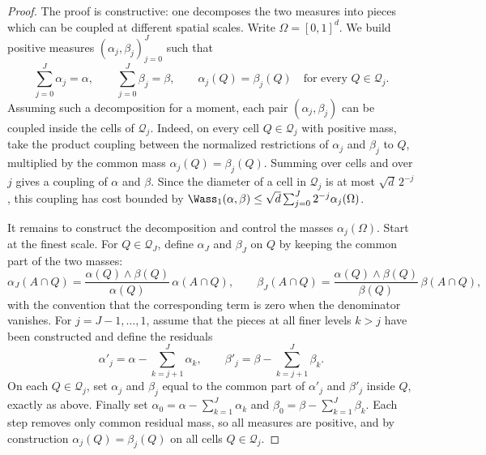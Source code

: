 \begin{proof}
	The proof is constructive: one decomposes the two measures into pieces which can be coupled at different spatial scales. Write \(\Omega=[0,1]^d\). We build positive measures \((\alpha_j,\beta_j)_{j=0}^J\) such that
	\[
		\sum_{j=0}^J\alpha_j=\alpha,
		\qquad
		\sum_{j=0}^J\beta_j=\beta,
		\qquad
		\alpha_j(Q)=\beta_j(Q)
		\quad\text{for every }Q\in\mathcal Q_j.
	\]
	Assuming such a decomposition for a moment, each pair \((\alpha_j,\beta_j)\) can be coupled inside the cells of \(\mathcal Q_j\). Indeed, on every cell \(Q\in\mathcal Q_j\) with positive mass, take the product coupling between the normalized restrictions of \(\alpha_j\) and \(\beta_j\) to \(Q\), multiplied by the common mass \(\alpha_j(Q)=\beta_j(Q)\). Summing over cells and over \(j\) gives a coupling of \(\alpha\) and \(\beta\). Since the diameter of a cell in \(\mathcal Q_j\) is at most \(\sqrt d\,2^{-j}\), this coupling has cost bounded by
	$\Wass_1(\alpha,\beta) \leq \sqrt d\sum_{j=0}^J2^{-j}\alpha_j(\Omega)$.

	It remains to construct the decomposition and control the masses \(\alpha_j(\Omega)\). Start at the finest scale. For \(Q\in\mathcal Q_J\), define \(\alpha_J\) and \(\beta_J\) on \(Q\) by keeping the common part of the two masses:
	\[
		\alpha_J(A\cap Q)
		=
		\frac{\alpha(Q)\wedge\beta(Q)}{\alpha(Q)}\,\alpha(A\cap Q),
		\qquad
		\beta_J(A\cap Q)
		=
		\frac{\alpha(Q)\wedge\beta(Q)}{\beta(Q)}\,\beta(A\cap Q),
	\]
	with the convention that the corresponding term is zero when the denominator vanishes. For \(j=J-1,\ldots,1\), assume that the pieces at all finer levels \(k>j\) have been constructed and define the residuals
	\[
		\alpha'_j=\alpha-\sum_{k=j+1}^J\alpha_k,
		\qquad
		\beta'_j=\beta-\sum_{k=j+1}^J\beta_k.
	\]
	On each \(Q\in\mathcal Q_j\), set \(\alpha_j\) and \(\beta_j\) equal to the common part of \(\alpha'_j\) and \(\beta'_j\) inside \(Q\), exactly as above. Finally set \(\alpha_0=\alpha-\sum_{k=1}^J\alpha_k\) and \(\beta_0=\beta-\sum_{k=1}^J\beta_k\). Each step removes only common residual mass, so all measures are positive, and by construction \(\alpha_j(Q)=\beta_j(Q)\) on all cells \(Q\in\mathcal Q_j\).


\end{proof}
